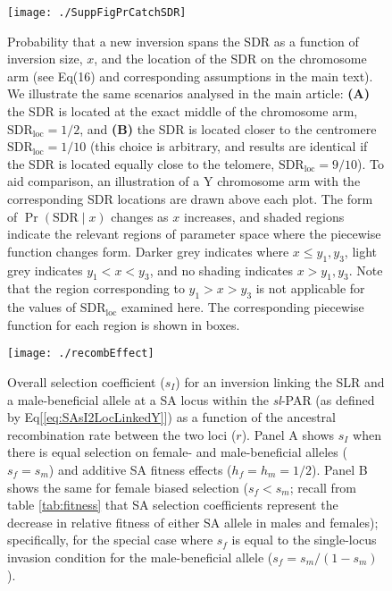 \documentclass[11pt]{article}
\begin{document}
\newpage


\begin{figure}[htbp]
 \centering
 \texttt{[image: ./SuppFigPrCatchSDR]}
 \caption{Probability that a new inversion spans the SDR as a function of inversion size, $x$, and the location of the SDR on the chromosome arm (see Eq(16) and corresponding assumptions in the main text). We illustrate the same scenarios analysed in the main article: \textbf{(A)} the SDR is located at the exact middle of the chromosome arm, $\text{SDR}_\text{loc} = 1/2$, and \textbf{(B)} the SDR is located closer to the centromere $\text{SDR}_\text{loc} = 1/10$ (this choice is arbitrary, and results are identical if the SDR is located equally close to the telomere, $\text{SDR}_\text{loc} = 9/10$). To aid comparison, an illustration of a Y chromosome arm with the corresponding SDR locations are drawn above each plot. The form of $\Pr (\text{SDR} \mid x)$ changes as $x$ increases, and shaded regions indicate the relevant regions of parameter space where the piecewise function changes form. Darker grey indicates where $x \leq y_1,y_3$, light grey indicates $y_1 < x < y_3$, and no shading indicates $x > y_1, y_3$. Note that the region corresponding to $y_1 > x > y_3$ is not applicable for the values of $\text{SDR}_\text{loc}$ examined here. The corresponding piecewise function for each region is shown in boxes.}
 \label{fig:PrCatchFixFig}
 \end{figure}


 \begin{figure}[!htbp]
 \centering
 \texttt{[image: ./recombEffect]}
 \caption{Overall selection coefficient ($s_I$) for an inversion linking the SLR and a male-beneficial allele at a SA locus within the {\itshape sl}-PAR (as defined by Eq[\ref{eq:SAsI2LocLinkedY}]) as a function of the ancestral recombination rate between the two loci ($r$). Panel A shows $s_I$ when there is equal selection on female- and male-beneficial alleles ($s_f = s_m$) and additive SA fitness effects ($h_f = h_m = 1/2$). Panel B shows the same for female biased selection ($s_f < s_m$; recall from table \ref{tab:fitness} that SA selection coefficients represent the decrease in relative fitness of either SA allele in males and females); specifically, for the special case where $s_f$ is equal to the single-locus invasion condition for the male-beneficial allele ($s_f = s_m / (1 - s_m)$).}
 \label{fig:recombEffect}
 \end{figure}
\end{document}
